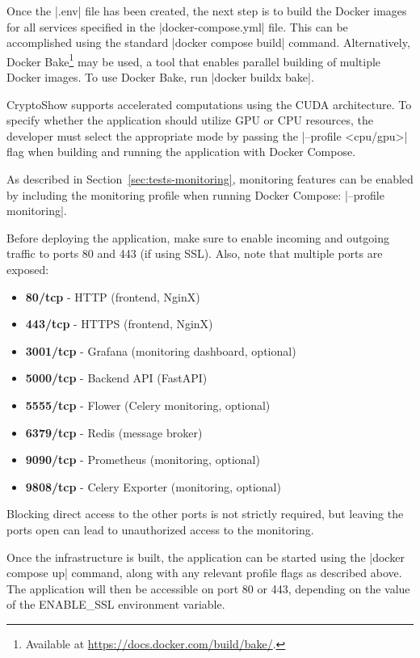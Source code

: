Once the \inline|.env| file has been created, the next step is to build the Docker images for all services specified in the \inline|docker-compose.yml| file. This can be accomplished using the standard \inline|docker compose build| command. Alternatively, Docker Bake\footnote{Available at \url{https://docs.docker.com/build/bake/}.} may be used, a tool that enables parallel building of multiple Docker images. To use Docker Bake, run \inline|docker buildx bake|.

CryptoShow supports accelerated computations using the CUDA architecture. To specify whether the application should utilize GPU or CPU resources, the developer must select the appropriate mode by passing the \inline|--profile <cpu/gpu>| flag when building and running the application with Docker Compose.

As described in Section~\ref{sec:tests-monitoring}, monitoring features can be enabled by including the monitoring profile when running Docker Compose: \inline|--profile monitoring|.

Before deploying the application, make sure to enable incoming and outgoing traffic to ports 80 and 443 (if using SSL). Also, note that multiple ports are exposed:

\begin{itemize}
    \item \textbf{80/tcp} - HTTP (frontend, NginX)
    \item \textbf{443/tcp} - HTTPS (frontend, NginX)
    \item \textbf{3001/tcp} - Grafana (monitoring dashboard, optional)
    \item \textbf{5000/tcp} - Backend API (FastAPI)
    \item \textbf{5555/tcp} - Flower (Celery monitoring, optional)
    \item \textbf{6379/tcp} - Redis (message broker)
    \item \textbf{9090/tcp} - Prometheus (monitoring, optional)
    \item \textbf{9808/tcp} - Celery Exporter (monitoring, optional)
\end{itemize}

Blocking direct access to the other ports is not strictly required, but leaving the ports open can lead to unauthorized access to the monitoring.

Once the infrastructure is built, the application can be started using the \inline|docker compose up| command, along with any relevant profile flags as described above. The application will then be accessible on port 80 or 443, depending on the value of the ENABLE\_SSL environment variable.

